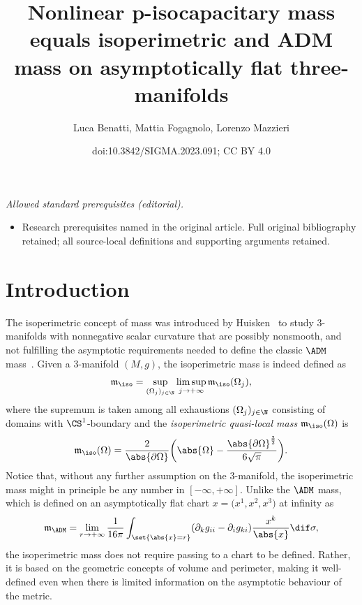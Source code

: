 \documentclass[10pt,a4paper]{amsart}
\title{Nonlinear p-isocapacitary mass equals isoperimetric and ADM mass on asymptotically flat three-manifolds}
\author{Luca Benatti, Mattia Fogagnolo, Lorenzo Mazzieri}
\date{doi:10.3842/SIGMA.2023.091; CC BY 4.0}
\numberwithin{equation}{section}
\newcommand{\ma}{\mathfrak{m}}
\begin{document}
\maketitle
\noindent\textit{Allowed standard prerequisites (editorial).}\begin{itemize}
\item Research prerequisites named in the original article. Full original bibliography retained; all source-local definitions and supporting arguments retained.
\end{itemize}\medskip
\section{Introduction}
The isoperimetric concept of mass was introduced by Huisken~\cite{huisken_isoperimetricconceptmassgeneral_2006} to study $3$-manifolds with nonnegative scalar curvature that are possibly nonsmooth, and not fulfilling the asymptotic requirements needed to define the classic $\ADM$ mass~\cite{arnowitt_coordinateinvarianceenergyexpressions_1961}. Given a $3$-manifold $(M,g)$, the isoperimetric mass is indeed defined as
\begin{equation}\label{eq:isoperimetric_mass_intro}
 \ma_{\iso}=\sup_{(\Omega_j)_{j\in \N}}\limsup_{j \to +\infty} \ma_{\iso}(\Omega_j),
\end{equation}
where the supremum is taken among all exhaustions $(\Omega_j)_{j\in \N}$ consisting of domains with $\CS^{1}$-boundary and the \textit{isoperimetric quasi-local mass} $\ma_{\iso}(\Omega)$ is
\begin{equation*}%
 \ma_{\iso}(\Omega)=\frac{2}{\abs{\partial \Omega}}\bigg( \abs{\Omega} -\frac{\abs{\partial \Omega}^{\frac{3}{2}}}{6 \sqrt{\pi}}\bigg).
\end{equation*}
Notice that, without any further assumption on the $3$-manifold, the isoperimetric mass might in principle be any number in $[-\infty,+\infty]$. Unlike the $\ADM$ mass, which is defined on an asymptotically flat chart $x=\big(x^1,x^2,x^3\big)$ at infinity as
\begin{equation*}%
 \ma_{\ADM} = \lim_{r \to +\infty}\frac{1}{16\pi} \int_{\set{\abs{x}= r}}(\partial_k g_{ii}- \partial_i g_{ki} ) \frac{x^k}{\abs{x}}\dif \sigma,
\end{equation*}
the isoperimetric mass does not require passing to a chart to be defined. Rather, it is based on the geometric concepts of volume and perimeter, making it well-defined even when there is limited information on the asymptotic behaviour of the metric.
\end{document}
